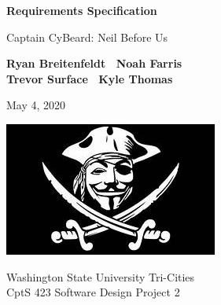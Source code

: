 \begin{titlepage}
    \begin{center}
        \vspace*{1cm}

        \Huge
        \textbf{Requirements Specification}

        \vspace{.5cm}
        \LARGE
        Captain CyBeard: Neil Before Us

        \vspace{1cm}

        \textbf{Ryan Breitenfeldt \textbar\ Noah Farris\\ Trevor Surface \textbar\ Kyle Thomas}

        \vspace{.2cm}
        \Large
        May 4, 2020

        \vspace{2cm}
        \includegraphics[scale=1]{logo}

        \vfill

        Washington State University Tri-Cities\\
        CptS 423 Software Design Project 2

    \end{center}
\end{titlepage}

